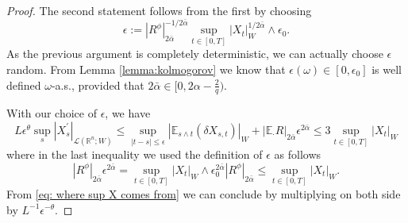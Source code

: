 \documentclass[11pt,a4paper]{article}
\newcommand{\R}{\mathbb{R}}
\newcommand{\E}{\mathbb{E}}
\theoremstyle{plain}
\begin{document}
\begin{proof}
    
    The second statement follows from the first by choosing 
     \begin{equation*}
     \epsilon 
     :=|R^\phi|_{2\bar{\alpha}}^{-1/2\bar{\alpha}}\sup_{t\in[0,T]}|X_t|_W^{1/2\bar{\alpha}}\wedge\epsilon_0.%
     \end{equation*}
     As the previous argument is completely deterministic, we can actually choose $\epsilon$ random. From Lemma \ref{lemma:kolmogorov} we know that $\epsilon(\omega) \in [0,\epsilon_0]$ is well defined $\omega$-a.s., provided that \linebreak $2\bar{\alpha} \in [0,2\alpha - \frac{2}{q})$. 
     

    With our choice of $\epsilon$, we have
    \begin{equation}
    \label{eq: where sup X comes from}
        L\epsilon^{\theta} \sup_{s}|X^{\prime}_s|_{\mathscr{L}(\R^n;W)}
        \leq \sup_{|t-s|\leq \epsilon}
          \left|
            \E_{s \wedge t} (\delta X_{s,t})
            \right|_W
            + \left|\mathbb{E}_\cdot R
        \right|_{2\bar{\alpha}} \epsilon^{2\bar{\alpha}}
        \leq { 3 \sup_{t \in [0,T]} |X_t|_W}
    \end{equation}
    where in the last inequality we used the definition of $\epsilon$ as follows
    \begin{equation*}
    |R^\phi|_{2\bar{\alpha}} \epsilon^{2\bar{\alpha}}
        = \sup_{t\in[0,T]}|X_t|_W\wedge\epsilon_0^{2\bar{\alpha}} |R^\phi|_{2\bar{\alpha}}
        \leq \sup_{t\in[0,T]}|X_t|_W.
    \end{equation*}
    From \eqref{eq: where sup X comes from} we can conclude by multiplying on both side by $L^{-1} \epsilon^{-\theta}$.
\end{proof}
\end{document}
